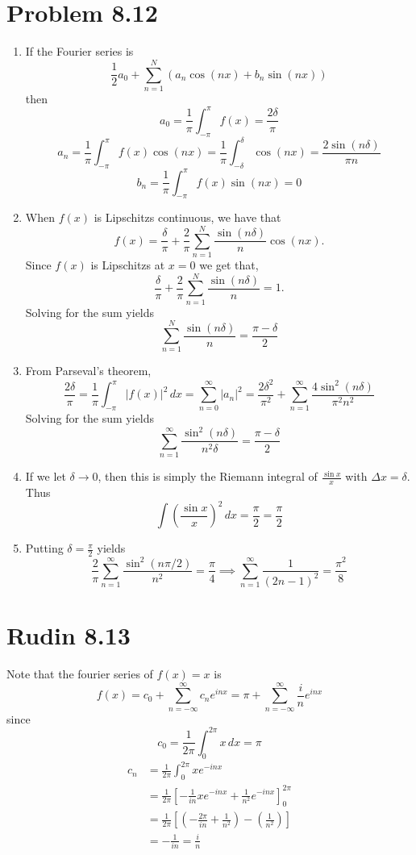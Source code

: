 \documentclass{article}
\begin{document}
\section*{Problem 8.12}
\begin{enumerate}
  \item If the Fourier series is
  \[
      \frac{1}{2}a_0 + \sum_{n=1}^N(a_n\cos (nx) + b_n \sin (nx)) 
  \]
  then
  \[
    a_0 = \frac{1}{\pi}\int_{-\pi}^{\pi} f(x) = \frac{2\delta}{\pi}
  \]
  \[
    a_n = \frac{1}{\pi}\int_{-\pi}^{\pi} f(x)\cos(nx) 
    = \frac{1}{\pi}\int_{-\delta}^{\delta} \cos(nx)
    = \frac{2\sin(n\delta)}{\pi n}
  \]
  \[
    b_n = \frac{1}{\pi}\int_{-\pi}^{\pi} f(x)\sin(nx) = 0
  \]
  \item When $f(x)$ is Lipschitzs continuous, we have that
  \[
    f(x) = \frac{\delta}{\pi} + \frac{2}{\pi}\sum_{n=1}^N\frac{\sin(n\delta)}{n} \cos (nx).
  \]
  Since $f(x)$ is Lipschitzs at $x=0$ we get that,
  \[
    \frac{\delta}{\pi} + \frac{2}{\pi}\sum_{n=1}^N\frac{\sin(n\delta)}{n} = 1.
  \]
  Solving for the sum yields
  \[
    \sum_{n=1}^N\frac{\sin(n\delta)}{n} = \frac{\pi -\delta}{2}
  \]
  \item From Parseval's theorem,
  \[  
     \frac{2\delta}{\pi} = \frac{1}{\pi} \int_{-\pi}^{\pi} |f(x)|^2 \,dx = 
     \sum_{n=0}^{\infty} |a_n|^2 = \frac{2\delta^2}{\pi^2} + \sum_{n=1}^{\infty} \frac{4\sin^2(n\delta)}{\pi^2 n^2}
  \]
  Solving for the sum yields 
  \[
    \sum_{n=1}^{\infty} \frac{\sin^2(n\delta)}{n^2\delta} = \frac{\pi - \delta}{2}
  \]
  \item If we let $\delta \to 0$, then this is simply the Riemann integral of $\frac{\sin x}{x}$
  with $\Delta x = \delta$.
  Thus 
  \[
    \int \left(\frac{\sin x}{x} \right)^2 \,dx = \frac{\pi}{2} = \frac{\pi}{2}
  \]
  \item Putting $\delta = \frac{\pi}{2}$ yields 
  \[  
      \frac{2}{\pi} \sum_{n=1}^{\infty} \frac{\sin^2 (n\pi /2)}{n^2}= \frac{\pi}{4}
      \implies \sum_{n=1}^{\infty} \frac{1}{(2n-1)^2}  = \frac{\pi^2}{8}
  \]
\end{enumerate}
\newpage 

\section*{Rudin 8.13}
Note that the fourier series of $f(x) = x$ is 
\[
  f(x) = c_0 + \sum_{n=-\infty}^{\infty} c_n e^{inx} = \pi + \sum_{n=-\infty}^{\infty} \frac{i}{n} e^{inx}
\]
since 
\[
  c_0 = \frac{1}{2\pi} \int_{0}^{2\pi}x \,dx = \pi
\]
\begin{align*}
  c_n &= \frac{1}{2\pi} \int_{0}^{2\pi} xe^{-inx} \\
  &=\frac{1}{2\pi} \left[-\frac{1}{in}xe^{-inx} + \frac{1}{n^2} e^{-inx}\right]_0^{2\pi} \\
  &= \frac{1}{2\pi}\left[\left(-\frac{2\pi}{in} + \frac{1}{n^2}\right) - \left(\frac{1}{n^2}\right)\right]\\
  &=-\frac{1}{in} = \frac{i}{n}
\end{align*}
\end{document}
